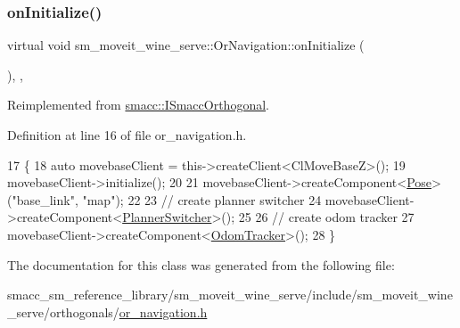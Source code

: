 \subsubsection{\texorpdfstring{on\+Initialize()}{onInitialize()}}
{\footnotesize\ttfamily virtual void sm\+\_\+moveit\+\_\+wine\+\_\+serve\+::\+Or\+Navigation\+::on\+Initialize (\begin{DoxyParamCaption}{ }\end{DoxyParamCaption})\hspace{0.3cm}{\ttfamily [inline]}, {\ttfamily [override]}, {\ttfamily [virtual]}}



Reimplemented from \hyperlink{classsmacc_1_1ISmaccOrthogonal_a6bb31c620cb64dd7b8417f8705c79c7a}{smacc\+::\+I\+Smacc\+Orthogonal}.



Definition at line 16 of file or\+\_\+navigation.\+h.


\begin{DoxyCode}
17     \{
18         \textcolor{keyword}{auto} movebaseClient = this->createClient<ClMoveBaseZ>();
19         movebaseClient->initialize();
20 
21         movebaseClient->createComponent<\hyperlink{classcl__move__base__z_1_1Pose}{Pose}>(\textcolor{stringliteral}{"base\_link"}, \textcolor{stringliteral}{"map"});
22 
23         \textcolor{comment}{// create planner switcher}
24         movebaseClient->createComponent<\hyperlink{classcl__move__base__z_1_1PlannerSwitcher}{PlannerSwitcher}>();
25 
26         \textcolor{comment}{// create odom tracker}
27         movebaseClient->createComponent<\hyperlink{classcl__move__base__z_1_1odom__tracker_1_1OdomTracker}{OdomTracker}>();
28     \}
\end{DoxyCode}


The documentation for this class was generated from the following file\+:\begin{DoxyCompactItemize}
\item 
smacc\+\_\+sm\+\_\+reference\+\_\+library/sm\+\_\+moveit\+\_\+wine\+\_\+serve/include/sm\+\_\+moveit\+\_\+wine\+\_\+serve/orthogonals/\hyperlink{sm__moveit__wine__serve_2include_2sm__moveit__wine__serve_2orthogonals_2or__navigation_8h}{or\+\_\+navigation.\+h}\end{DoxyCompactItemize}
